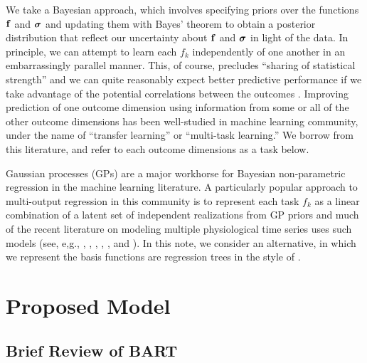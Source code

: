 \documentclass[12pt]{article}
\begin{document}
We take a Bayesian approach, which involves specifying priors over the functions $\bf$ and $\bsigma$ and updating them with Bayes' theorem to obtain a posterior distribution that reflect our uncertainty about $\bf$ and $\bsigma$ in light of the data.
In principle, we can attempt to learn each $f_{k}$ independently of one another in an embarrassingly parallel manner.
This, of course, precludes ``sharing of statistical strength'' and we can quite reasonably expect better predictive performance if we take advantage of the potential correlations between the outcomes \citep[see, e.g.,][]{Breiman1997}. 
Improving prediction of one outcome dimension using information from some or all of the other outcome dimensions has been well-studied in machine learning community, under the name of ``transfer learning'' or ``multi-task learning.''
We borrow from this literature, and refer to each outcome dimensions as a task below.


Gaussian processes (GPs) are a major workhorse for Bayesian non-parametric regression in the machine learning literature.
A particularly popular approach to multi-output regression in this community is to represent each task $f_{k}$ as a linear combination of a latent set of independent realizations from GP priors and much of the recent literature on modeling multiple physiological time series uses such models (see, e,g., \citet{Clifton2012}, \citet{Ghassemi2015}, \citet{Durichen2015}, \citet{Futoma2017}, \citet{Colopy2018}, and \citet{Cheng2018}).
In this note, we consider an alternative, in which we represent the basis functions are regression trees in the style of \citet{Chipman2010}.



\section{Proposed Model}
\label{sec:slfm_bart_model}

\subsection{Brief Review of BART}
\label{sec:bart_review}
\end{document}
